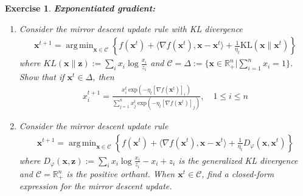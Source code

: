 \documentclass[12pt]{article}
\DeclareMathOperator*{\argmin}{arg\,min}
\theoremstyle{colon}
\newtheorem{exercise}{Exercise}
\begin{document}
\begin{exercise}

	\textbf{Exponentiated gradient:}

	\begin{enumerate}[label=\alph*)]
		\item Consider the mirror descent update rule with KL divergence
			\begin{gather*}
				\bm{x}^{t+1} = \argmin_{\bm{x} \in \mathcal{C}} \left\{ f(\bm{x}^t) + \langle \nabla f(\bm{x}^t), \bm{x} - \bm{x}^t \rangle + \frac{1}{\eta_t} \text{KL}(\bm{x} \lVert \bm{x}^t) \right\}
			\end{gather*}
			where $KL(\bm{x} \lVert \bm{z}) := \sum_i x_i \log \frac{x_i}{z_i}$ and $\mathcal{C} = \Delta := \{ \bm{x} \in \mathbb{R}_+^n | \sum_{i=1}^n x_i = 1\}$. Show that if $\bm{x}^t \in \Delta$, then
			\begin{gather*}
				x_i^{t+1} = \frac{x_i^t \ \text{exp}(-\eta_t [\nabla f(\bm{x}^t)]_i)}{\sum_{j=1}^n x_j^t \ \text{exp}(-\eta_t [\nabla f(\bm{x}^t)]_j)}, \quad 1 \leq i \leq n
			\end{gather*}

		\item Consider the mirror descent update rule
			\begin{gather*}
				\bm{x}^{t+1} = \argmin_{\bm{x} \in \mathcal{C}} \left\{ f(\bm{x}^t) + \langle \nabla f(\bm{x}^t), \bm{x} - \bm{x}^t \rangle + \frac{1}{\eta_t} D_\varphi(\bm{x}, \bm{x}^t) \right\} 
			\end{gather*}
			where $D_\varphi(\bm{x}, \bm{z}) := \sum_i x_i \log \frac{x_i}{z_i} - x_i + z_i$ is the generalized KL divergence and $\mathcal{C} = \mathbb{R}_+^n$ is the positive orthant. When $\bm{x}^t \in \mathcal{C}$, find a closed-form expression for the mirror descent update.
	\end{enumerate}

\end{exercise}
\end{document}
